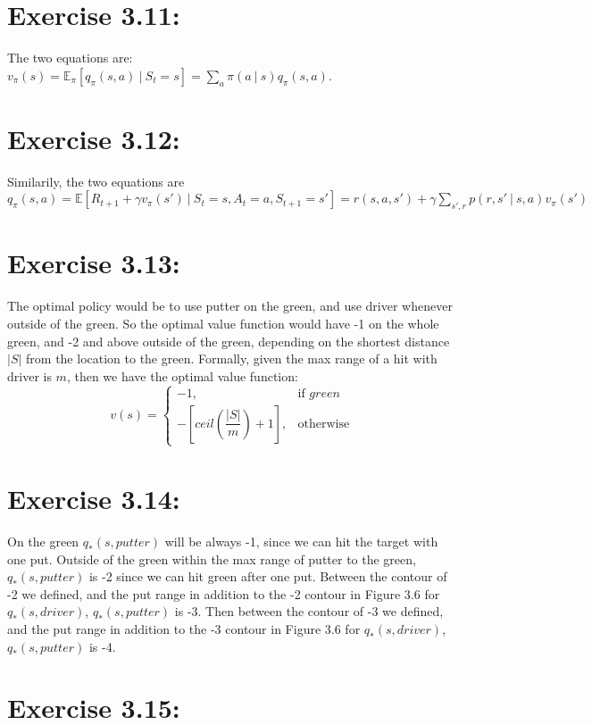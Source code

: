 \documentclass[10pt,letterpaper]{article}
\newcommand\given[1][]{\:#1\vert\:}
\begin{document}
\section*{Exercise 3.11: }
\label{3.11}

The two equations are: $v_\pi(s) = \mathbb{E}_\pi[q_\pi(s,a)\given S_t=s] = \sum_a \pi(a\given s)q_\pi(s,a)$.


\section*{Exercise 3.12: }
\label{3.12}

Similarily, the two equations are $q_\pi(s,a) = \mathbb{E}[R_{t+1} + \gamma v_\pi(s') \given S_t=s, A_t=a, S_{t+1} = s'] = r(s,a,s') + \gamma\sum_{s',r}p(r,s'\given s,a)v_\pi(s')$


\section*{Exercise 3.13: }
\label{3.13}

The optimal policy would be to use putter on the green, and use driver whenever outside of the green. So the optimal value function would have -1 on the whole green, and -2 and above outside of the green, depending on the shortest distance $|S|$ from the location to the green. Formally, given the max range of a hit with driver is $m$, then we have the optimal value function:
\[v(s) = \begin{cases}
-1,& \text{if } green\\
-[ceil(\dfrac{|S|}{m}) + 1],              & \text{otherwise}
\end{cases}
\]


\section*{Exercise 3.14: }
\label{3.14}

On the green $q_*(s, putter)$ will be always -1, since we can hit the target with one put. Outside of the green within the max range of putter to the green, $q_*(s, putter)$ is -2 since we can hit green after one put. Between the contour of -2 we defined, and the put range in addition to the -2 contour in Figure 3.6 for $q_*(s, driver)$, $q_*(s, putter)$ is -3. Then between the contour of -3 we defined, and the put range in addition to the -3 contour in Figure 3.6 for $q_*(s, driver)$, $q_*(s, putter)$ is -4.

\section*{Exercise 3.15: }
\label{3.15}
\end{document}
